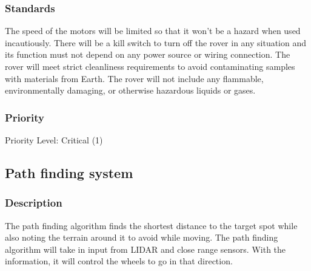 \subsubsection{Standards}
The speed of the motors will be limited so that it won't be a hazard when used incautiously. There will be a kill switch to turn off the rover in any situation and its function must not depend on any power source or wiring connection. The rover will meet strict cleanliness requirements to avoid contaminating samples with materials from Earth. The rover will not include any flammable, environmentally damaging, or otherwise hazardous liquids or gases.
\subsubsection{Priority}
Priority Level: Critical (1)

\subsection{Path finding system}
\subsubsection{Description}
The path finding algorithm finds the shortest distance to the target spot while also noting the terrain around it to avoid while moving. The path finding algorithm will take in input from LIDAR and close range sensors. With the information, it will control the wheels to go in that direction.
